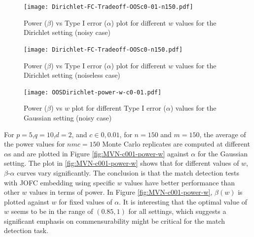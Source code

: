\documentclass[12pt,oneside,final]{thesis}
\begin{document}
\begin{figure}
\texttt{[image: Dirichlet-FC-Tradeoff-OOSc0-01-n150.pdf]}
\caption{Power ($\beta$) vs Type I error ($\alpha$) plot for different $w$ values for the Dirichlet setting (noisy case)}
\label{fig:Dir-c001-power-alpha}
\end{figure}

\begin{figure}
\texttt{[image: Dirichlet-FC-Tradeoff-OOSc0-n150.pdf]}
\caption{Power ($\beta$) vs Type I error ($\alpha$) plot for different $w$ values for the Dirichlet setting (noiseless case)}
\label{fig:Dir-c0-power-alpha}
\end{figure}

\begin{figure}
\texttt{[image: OOSDirichlet-power-w-c0-01.pdf]}
\caption{Power ($\beta$) vs $w$ plot for different Type I error ($\alpha$) values for the Gaussian setting (noisy case)}
\label{fig:Dir-c001-power-w}
\end{figure}

For $p=5$,$q=10$,$d=2$, and $c\in{0,0.01}$, for $n=150$ and $m=150$, the average of the power values for $nmc=150$ Monte Carlo replicates are computed at  different $\alpha$s and are plotted in Figure \ref{fig:MVN-c001-power-w} against $\alpha$ for the Gaussian setting.  
The plot in \autoref{fig:MVN-c001-power-w} shows that for different values of  $w$, $\beta$-$\alpha$ curves vary significantly.  The conclusion is that the match detection tests with JOFC embedding using specific $w$ values have better performance than other $w$ values in terms of power.  In Figure
 \ref{fig:MVN-c001-power-w},  $\beta(w)$ is plotted against $w$ for fixed values of $\alpha$. It is  interesting that the optimal value of $w$ seems to be in the range of $(0.85,1)$ for all settings, which suggests a significant emphasis on commensurability might be  critical for the match detection  task. 

\end{document}
